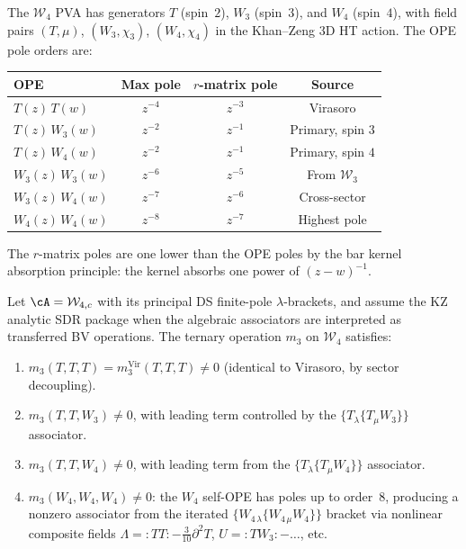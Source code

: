 The $\mathcal{W}_4$ PVA has generators $T$ (spin~$2$), $W_3$
(spin~$3$), and $W_4$ (spin~$4$), with field pairs
$(T, \mu)$, $(W_3, \chi_3)$, $(W_4, \chi_4)$ in the
Khan--Zeng 3D HT action. The OPE pole orders are:
\begin{center}
\renewcommand{\arraystretch}{1.2}
\begin{tabular}{lccc}
\toprule
OPE & Max pole & $r$-matrix pole & Source \\
\midrule
$T(z)\,T(w)$ & $z^{-4}$ & $z^{-3}$ & Virasoro \\
$T(z)\,W_3(w)$ & $z^{-2}$ & $z^{-1}$ & Primary, spin $3$ \\
$T(z)\,W_4(w)$ & $z^{-2}$ & $z^{-1}$ & Primary, spin $4$ \\
$W_3(z)\,W_3(w)$ & $z^{-6}$ & $z^{-5}$ & From $\mathcal{W}_3$ \\
$W_3(z)\,W_4(w)$ & $z^{-7}$ & $z^{-6}$ & Cross-sector \\
$W_4(z)\,W_4(w)$ & $z^{-8}$ & $z^{-7}$ & Highest pole \\
\bottomrule
\end{tabular}
\end{center}
The $r$-matrix poles are one lower than the OPE poles by the
bar kernel absorption principle: the kernel absorbs one power
of $(z-w)^{-1}$.

\begin{proposition}
\label{prop:w4-m3}
%
Let\/ $\cA=\mathcal W_{4,c}$ with its principal DS finite-pole
$\lambda$-brackets, and assume the KZ analytic SDR package when the
algebraic associators are interpreted as transferred BV operations.
The ternary operation $m_3$ on $\mathcal{W}_4$ satisfies:
\begin{enumerate}[label=\textup{(\roman*)}]
\item $m_3(T,T,T) = m_3^{\mathrm{Vir}}(T,T,T) \ne 0$
 \textup{(}identical to Virasoro, by sector decoupling\textup{)}.
\item $m_3(T,T,W_3) \ne 0$, with leading term controlled by
 the $\{T_\lambda \{T_\mu W_3\}\}$ associator.
\item $m_3(T,T,W_4) \ne 0$, with leading term from
 the $\{T_\lambda \{T_\mu W_4\}\}$ associator.
\item $m_3(W_4, W_4, W_4) \ne 0$: the $W_4$ self-OPE has
 poles up to order~$8$, producing a nonzero associator
 from the iterated $\{W_{4\,\lambda} \{W_{4\,\mu} W_4\}\}$
 bracket via nonlinear composite fields
 $\Lambda = {:}TT{:} - \tfrac{3}{10}\partial^2 T$,
 $U = {:}TW_3{:} - \ldots$, etc.
\end{enumerate}
\end{proposition}

